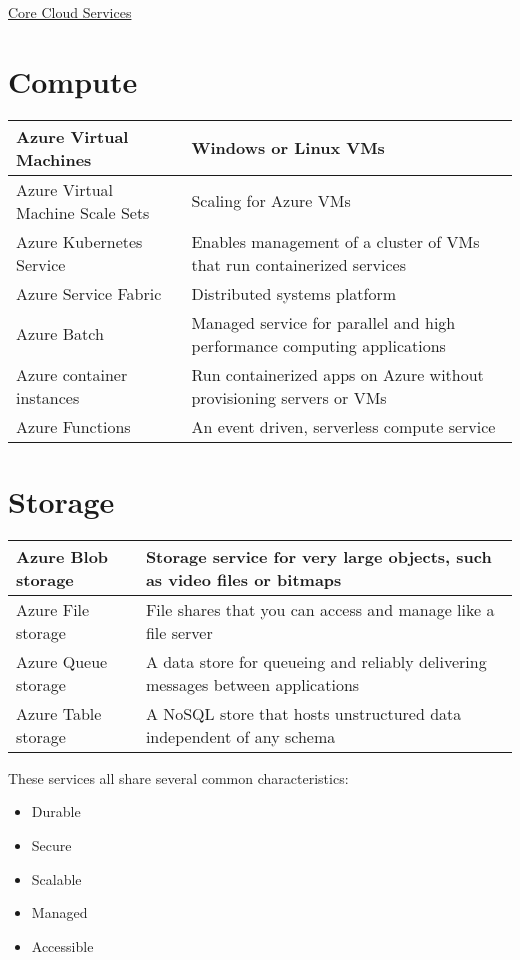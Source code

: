 \documentclass{article}[18pt]
\begin{document}
\begin{center}
\underline{\huge Core Cloud Services}
\end{center}
\section{Compute}
{\renewcommand{\arraystretch}{2}
	\begin{tabularx}{\textwidth}{X X}
		
		Azure Virtual Machines & Windows or Linux VMs\\
		\hline
		Azure Virtual Machine Scale Sets & Scaling for Azure VMs\\
		\hline
		Azure Kubernetes Service& Enables management of a cluster of VMs that run containerized services\\
		\hline
		Azure Service Fabric&Distributed systems platform\\
		\hline
		Azure Batch& Managed service for parallel and high performance computing applications\\
		\hline
		Azure container instances& Run containerized apps on Azure without provisioning servers or VMs\\
		\hline
		Azure Functions& An event driven, serverless compute service
		
	\end{tabularx}
}

\section{Storage}
{\renewcommand{\arraystretch}{2}
	\begin{tabularx}{\textwidth}{X X}
		
		Azure Blob storage& Storage service for very large objects, such as video files or bitmaps\\
		\hline
		Azure File storage& File shares that you can access and manage like a file server\\
		\hline
		Azure Queue storage& A data store for queueing and reliably delivering messages between applications\\
		\hline
		Azure Table storage& A NoSQL store that hosts unstructured data independent of any schema
		
	\end{tabularx}
}
These services all share several common characteristics:
\begin{itemize}
	\item Durable
	\item Secure
	\item Scalable
	\item Managed
	\item Accessible
\end{itemize}
\end{document}
